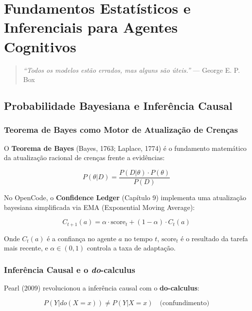 \chapter{Fundamentos Estatísticos e Inferenciais para Agentes Cognitivos}

\begin{quote}
\textit{``Todos os modelos estão errados, mas alguns são úteis.''} --- George E. P. Box
\end{quote}

\section{Probabilidade Bayesiana e Inferência Causal}

\subsection{Teorema de Bayes como Motor de Atualização de Crenças}

O \textbf{Teorema de Bayes} (Bayes, 1763; Laplace, 1774) é o fundamento matemático da atualização racional de crenças frente a evidências:

\begin{equation}
P(\theta | D) = \frac{P(D | \theta) \cdot P(\theta)}{P(D)}
\label{eq:bayes}
\end{equation}

No OpenCode, o \textbf{Confidence Ledger} (Capítulo 9) implementa uma atualização bayesiana simplificada via EMA (Exponential Moving Average):

\begin{equation}
C_{t+1}(a) = \alpha \cdot \text{score}_t + (1-\alpha) \cdot C_t(a)
\label{eq:ema_confidence}
\end{equation}

Onde $C_t(a)$ é a confiança no agente $a$ no tempo $t$, $\text{score}_t$ é o resultado da tarefa mais recente, e $\alpha \in (0,1)$ controla a taxa de adaptação.

\subsection{Inferência Causal e o \textit{do}-calculus}

Pearl (2009) \cite{pearl2009causality} revolucionou a inferência causal com o \textbf{do-calculus}:

\begin{equation}
P(Y | do(X=x)) \neq P(Y | X=x) \quad \text{(confundimento)}
\label{eq:do_calculus}
\end{equation}

